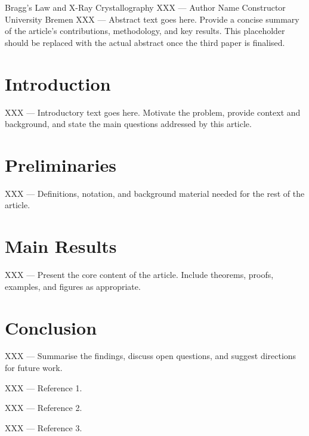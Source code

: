 \label{art:three}

\articleheader
  {Bragg's Law and X-Ray Crystallography}
  {XXX --- Author Name}
  {Constructor University Bremen}
  {XXX --- Abstract text goes here.  Provide a concise summary of the
   article's contributions, methodology, and key results.  This placeholder
   should be replaced with the actual abstract once the third paper is
   finalised.}


\section{Introduction}

XXX --- Introductory text goes here.  Motivate the problem, provide
context and background, and state the main questions addressed by this
article.

\section{Preliminaries}

XXX --- Definitions, notation, and background material needed for the
rest of the article.

\section{Main Results}

XXX --- Present the core content of the article.  Include theorems,
proofs, examples, and figures as appropriate.

\section{Conclusion}

XXX --- Summarise the findings, discuss open questions, and suggest
directions for future work.

\articlereferences

\begin{enumerate}[label={[\arabic*]}, leftmargin=2em, itemsep=0.25em]
  \item XXX --- Reference 1.
  \item XXX --- Reference 2.
  \item XXX --- Reference 3.
\end{enumerate}
